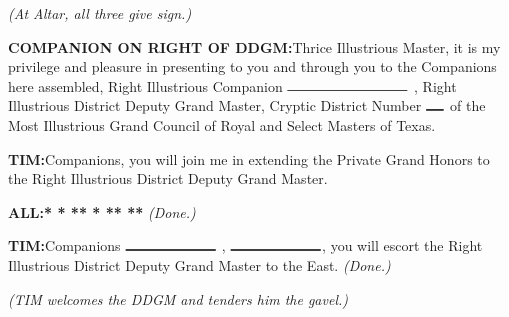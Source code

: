 \documentclass[letterpaper]{article}
\newcommand{\tridot}{\raisebox{0.3ex}{\textbf{{\small$\pmb{\boldsymbol{\therefore}}$}}}}
\newcommand{\smallspace}{\hspace{0.5ex}}
\newcommand{\blank}[1]{$\rule{#1ex}{1pt}$}
\newcommand{\tab}{\hspace{3ex}}
\newcommand{\knock}{\textbf{* * *\tab{}* * *\tab{}* *\tab{}*}}
\newcommand{\all}{{\color{eggplant}\textbf{ALL:}}\tab{}}
\newcommand{\comp}{{\color{eggplant}\textbf{COMPANION ON RIGHT OF DDGM:}}\tab{}}
\newcommand{\tim}{{\color{eggplant}\textbf{T\smallspace{}\tridot{}\smallspace{}I\smallspace{}\tridot{}\smallspace{}M\smallspace{}\tridot{}\smallspace{}:}}\tab{}}
\begin{document}
\hspace{16ex}\textit{(At Altar, all three give sign.)} 

\comp Thrice Illustrious Master, it is my privilege and pleasure in presenting to you and through you to the Companions here assembled, Right Illustrious Companion \blank{20} , Right Illustrious District Deputy Grand Master, Cryptic District Number \blank{3} of the Most Illustrious Grand Council of Royal and Select Masters of Texas.

\tim Companions, you will join me in extending the Private Grand Honors to the Right
Illustrious District Deputy Grand Master.

\all \knock \tab{} \textit{(Done.)}

\tim Companions \blank{15} , \blank{15}, you will escort the Right Illustrious District Deputy Grand Master to the East. \textit{(Done.)}

\hspace{16ex}\textit{(T\smallspace{}\tridot{}\smallspace{}I\smallspace{}\tridot{}\smallspace{}M\smallspace{}\tridot{}\smallspace{} welcomes the DDGM and tenders him the gavel.)}
\end{document}
